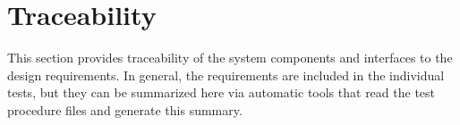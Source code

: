 
\chapter{Traceability}
\label{loc:Traceability}


This section provides traceability of the system components and interfaces to the design requirements.
In general, the requirements are included in the individual tests, but they can be summarized here via automatic tools that read the test procedure files and generate this summary.
